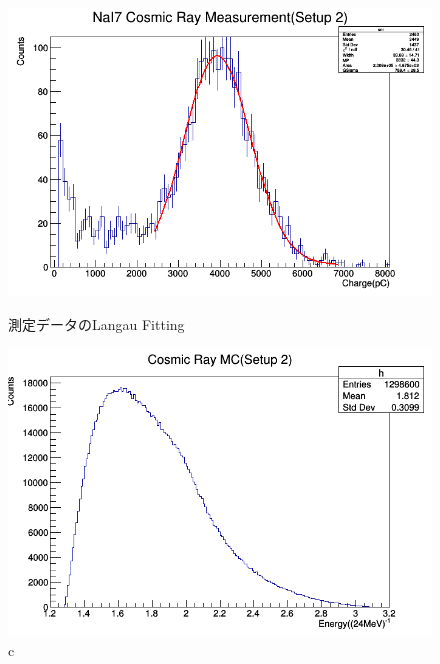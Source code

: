 \begin{figure}[H]
  \begin{minipage}{0.45\hsize}
    \begin{center}\hspace*{-1em}
  \includegraphics[width=1\textwidth]{figure/tajima/NaI7_Setup2.png}
      \caption{測定データのLangau Fitting}\label{langau}
    \end{center}
  \end{minipage}\hfill
  \begin{minipage}{0.45\hsize}
    \begin{center}
      \includegraphics[width=1\textwidth]{figure/tajima/MC2.png}
      \caption{c}\label{MC2}
    \end{center}
  \end{minipage}
\end{figure}

